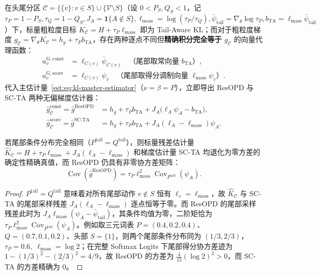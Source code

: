\documentclass[lang=cn,scheme=chinese,openany]{elegantbook}
\newcommand{\tail}{\mathrm{tail}}
\begin{document}
在头尾分区 $\mathcal C=\{\{v\}:v\in S\}\cup\{\mathcal V\setminus S\}$（设 $0<P_S,Q_S<1$，记 $\tau_P=1-P_S,\tau_Q=1-Q_S, J_A=\mathbf1\{A\notin S\}, \ell_{\mathrm{mass}}=\log(\tau_P/\tau_Q), \bar\psi_\tail=\nabla_\theta\log\tau_P, b_{\mathrm{TA}}=\ell_{\mathrm{mass}}\bar\psi_\tail$）下，标量粗粒度目标 $K_{\mathcal C}=H+\tau_P\ell_{\mathrm{mass}}$ 即为 Tail-Aware KL；而对于粗粒度梯度 $g_{\mathcal C}=\nabla_\theta K_{\mathcal C}=h_g+\tau_P b_{\mathrm{TA}}$，存在两种逐点不同但\textbf{精确积分完全等于 $g_{\mathcal C}$} 的向量代理函数：
\begin{align*}
 a^{\mathrm{G,const}}_v&=\ell_{C(v)}\bar\psi_{C(v)}\quad\text{（尾部取常向量 }b_{\mathrm{TA}}\text{）},\\
 a^{\mathrm{G,score}}_v&=\ell_{C(v)}\psi_v\quad\text{（尾部取得分调制向量 }\ell_{\mathrm{mass}}\psi_v\text{）}.
\end{align*}
代入主估计量~\eqref{est:eq:kl-master-estimator}（$\nu=\beta=P$），立即导出 ResOPD 与 SC-TA 两种无偏梯度估计器：
\begin{align}
 \widehat g_{\mathcal C}^{\mathrm{const}}=\widehat g^{\mathrm{ResOPD}}
 &=h_g+\tau_P b_{\mathrm{TA}}+J_A\bigl(\ell_A\psi_A-b_{\mathrm{TA}}\bigr),
 \label{inf:eq:kl-partition-constant-estimator}\\
 \widehat g_{\mathcal C}^{\mathrm{score}}=\widehat g^{\mathrm{SC\text{-}TA}}
 &=h_g+\tau_P b_{\mathrm{TA}}+J_A(\ell_A-\ell_{\mathrm{mass}})\psi_A.
 \label{inf:eq:kl-partition-score-estimator}
\end{align}

\begin{proposition}
若尾部条件分布完全相同（$P^{\tail}=Q^{\tail}$），则标量残差估计量 $\widehat K_{\mathcal C}=H+\tau_P\ell_{\mathrm{mass}}+J_A(\ell_A-\ell_{\mathrm{mass}})$ 和梯度估计量 SC-TA 均退化为零方差的确定性精确真值，而 ResOPD 仍具有非零协方差矩阵：
\begin{equation*}
 \operatorname{Cov}(\widehat g^{\mathrm{ResOPD}})
 =\tau_P\ell_{\mathrm{mass}}^2\operatorname{Cov}_{P^{\tail}}(\psi_A).
\end{equation*}
\end{proposition}
\begin{proof}
$P^{\tail}=Q^{\tail}$ 意味着对所有尾部动作 $v\notin S$ 恒有 $\ell_v=\ell_{\mathrm{mass}}$，故 $\widehat K_{\mathcal C}$ 与 SC-TA 的尾部采样残差 $J_A(\ell_A-\ell_{\mathrm{mass}})$ 逐点恒等于零。而 ResOPD 的尾部采样残差此时为 $J_A\ell_{\mathrm{mass}}(\psi_A-\bar \psi_\tail)$，其条件均值为零，二阶矩恰为 $\tau_P\ell_{\mathrm{mass}}^2\operatorname{Cov}_{P^{\tail}}(\psi_A)$。例如取三元词表 $P=(0.4,0.2,0.4)$、$Q=(0.7,0.1,0.2)$、头部 $S=\{1\}$，则两个尾部条件分布同为 $(1/3,2/3)$，$\tau_P=0.6,\;\ell_{\mathrm{mass}}=\log 2$；在完整 Softmax Logits 下尾部得分协方差迹为 $1-(1/3)^2-(2/3)^2=4/9$，故 ResOPD 的方差为 $\frac{4}{15}(\log 2)^2>0$，而 SC-TA 的方差精确为 $0$。
\end{proof}
\end{document}
